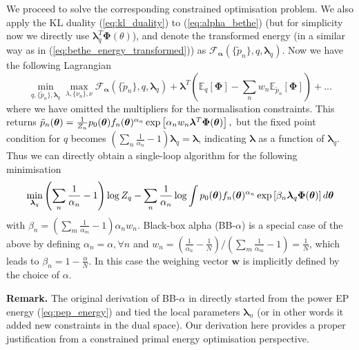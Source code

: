 %
We proceed to solve the corresponding constrained optimisation problem. We also apply the KL duality (\ref{eq:kl_duality}) to (\ref{eq:alpha_bethe}) (but for simplicity now we directly use $\bm{\lambda}_q^T \bm{\Phi}(\theta)$), and denote the transformed energy (in a similar way as in (\ref{eq:bethe_energy_transformed})) as $\mathcal{F}_{\bm{\alpha}}( \{ \tilde{p}_n \}, q, \bm{\lambda}_q)$. Now we have the following Lagrangian
\begin{equation}
\min_{q, \{ \tilde{p}_n \}, \bm{\lambda}_q} \max_{\lambda, \{ \nu_n \}, \nu } \mathcal{F}_{\bm{\alpha}}( \{ \tilde{p}_n \}, q, \bm{\lambda}_q) + \bm{\lambda}^{T}(\mathbb{E}_q[\bm{\Phi}] - \sum_n w_n \mathbb{E}_{\tilde{p}_n}[\bm{\Phi}]) + ...
\label{eq:bbalpha_local_lagranrian}
\end{equation}
%
where we have omitted the multipliers for the normalisation constraints. This returns
$
\tilde{p}_n(\bm{\theta}) = \frac{1}{Z_n} p_0(\bm{\theta})f_n(\bm{\theta})^{\alpha_n} \exp \left[ \alpha_n w_n \bm{\lambda}^T \bm{\Phi}(\bm{\theta}) \right],
$
but the fixed point condition for $q$ becomes $\left(\sum_n \frac{1}{\alpha_n} - 1  \right)\bm{\lambda}_q = \bm{\lambda}$, indicating $\bm{\lambda}$ as a function of $\bm{\lambda}_q$. Thus we can directly obtain a single-loop algorithm for the following minimisation
\begin{equation}
\min_{\bm{\lambda}_q} \left( \sum_n \frac{1}{\alpha_n} - 1 \right) \log Z_q - \sum_n \frac{1}{\alpha_n} \log \int p_0(\bm{\theta}) f_n(\bm{\theta})^{\alpha_n} \exp \left[\beta_n \bm{\lambda}_q \bm{\Phi}(\bm{\theta}) \right] d\bm{\theta}
\end{equation}
with $\beta_n = \left(\sum_m \frac{1}{\alpha_m} - 1 \right) \alpha_n w_n$. Black-box alpha (BB-$\alpha$) \citep{hernandez-lobato:bbalpha2016} is a special case of the above by defining $\alpha_n = \alpha, \forall n$ and 
$w_n = (\frac{1}{\alpha_n} - \frac{1}{N}) / (\sum_m \frac{1}{\alpha_m} - 1) = \frac{1}{N}$,
which leads to $\beta_n = 1 - \frac{\alpha}{N}$. In this case the weighing vector $\bm{w}$ is implicitly defined by the choice of $\alpha$.

\vspace{1em}
\begin{tcolorbox}
\textbf{Remark.} The original derivation of BB-$\alpha$ in \citet{hernandez-lobato:bbalpha2016} directly started from the power EP energy (\ref{eq:pep_energy}) and tied the local parameters $\bm{\lambda}_n$ (or in other words it added new constraints in the dual space). Our derivation here provides a proper justification from a constrained primal energy optimisation perspective. 
\end{tcolorbox}

